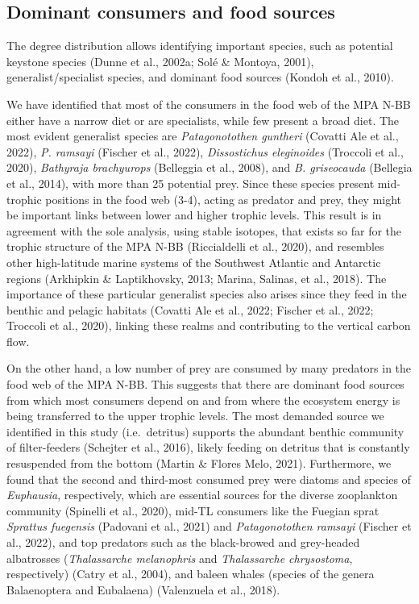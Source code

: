 \documentclass[preprint, 3p,
authoryear]{elsarticle} %
\begin{document}
\hypertarget{dominant-consumers-and-food-sources}{%
\subsection{Dominant consumers and food
sources}\label{dominant-consumers-and-food-sources}}

The degree distribution allows identifying important species, such as
potential keystone species (Dunne et al., 2002a; Solé \& Montoya, 2001),
generalist/specialist species, and dominant food sources (Kondoh et al.,
2010).

We have identified that most of the consumers in the food web of the MPA
N-BB either have a narrow diet or are specialists, while few present a
broad diet. The most evident generalist species are \emph{Patagonotothen
guntheri} (Covatti Ale et al., 2022), \emph{P. ramsayi} (Fischer et al.,
2022), \emph{Dissostichus eleginoides} (Troccoli et al., 2020),
\emph{Bathyraja brachyurops} (Belleggia et al., 2008), and \emph{B.
griseocauda} (Bellegia et al., 2014), with more than 25 potential prey.
Since these species present mid-trophic positions in the food web (3-4),
acting as predator and prey, they might be important links between lower
and higher trophic levels. This result is in agreement with the sole
analysis, using stable isotopes, that exists so far for the trophic
structure of the MPA N-BB (Riccialdelli et al., 2020), and resembles
other high-latitude marine systems of the Southwest Atlantic and
Antarctic regions (Arkhipkin \& Laptikhovsky, 2013; Marina, Salinas, et
al., 2018). The importance of these particular generalist species also
arises since they feed in the benthic and pelagic habitats (Covatti Ale
et al., 2022; Fischer et al., 2022; Troccoli et al., 2020), linking
these realms and contributing to the vertical carbon flow.

On the other hand, a low number of prey are consumed by many predators
in the food web of the MPA N-BB. This suggests that there are dominant
food sources from which most consumers depend on and from where the
ecosystem energy is being transferred to the upper trophic levels. The
most demanded source we identified in this study (i.e.~detritus)
supports the abundant benthic community of filter-feeders (Schejter et
al., 2016), likely feeding on detritus that is constantly resuspended
from the bottom (Martin \& Flores Melo, 2021). Furthermore, we found
that the second and third-most consumed prey were diatoms and species of
\emph{Euphausia}, respectively, which are essential sources for the
diverse zooplankton community (Spinelli et al., 2020), mid-TL consumers
like the Fuegian sprat \emph{Sprattus fuegensis} (Padovani et al., 2021)
and \emph{Patagonotothen ramsayi} (Fischer et al., 2022), and top
predators such as the black-browed and grey-headed albatrosses
(\emph{Thalassarche melanophris} and \emph{Thalassarche chrysostoma},
respectively) (Catry et al., 2004), and baleen whales (species of the
genera Balaenoptera and Eubalaena) (Valenzuela et al., 2018).
\end{document}
